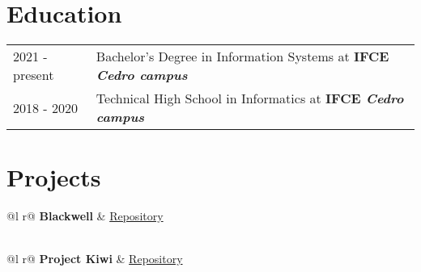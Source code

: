 \documentclass[a4paper,12pt]{article}
\begin{document}
\section{Education}
\begin{tabularx}{\linewidth}{@{}l X@{}}	
2021 - present & Bachelor's Degree in Information Systems at \textbf{IFCE \textit{Cedro campus}} \\ 

2018 - 2020 & Technical High School in Informatics at \textbf{IFCE \textit{Cedro campus}} \\

\end{tabularx}

\section{Projects}

\begin{tabularx}{\linewidth}{ @{}l r@{} }
\textbf{Blackwell} & \hfill \href{https://github.com/helpmeagain/blackwell}{Repository} \\[3.75pt]
  \\
\end{tabularx}

\begin{tabularx}{\linewidth}{ @{}l r@{} }
\textbf{Project Kiwi} & \hfill \href{https://github.com/helpmeagain/project-kiwi}{Repository} \\[3.75pt]
  \\
\end{tabularx}

\end{document}
